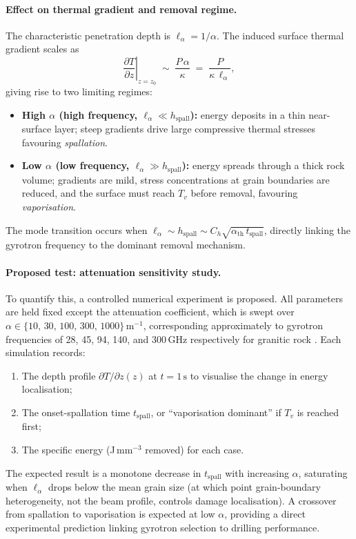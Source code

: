 \documentclass[12pt, a4paper]{article}
\begin{document}
\paragraph{Effect on thermal gradient and removal regime.}
The characteristic penetration depth is $\ell_\alpha = 1/\alpha$.
The induced surface thermal gradient scales as
\begin{equation}
    \left.\frac{\partial T}{\partial z}\right|_{z=z_0}
    \;\sim\; \frac{P\,\alpha}{\kappa}
    \;=\; \frac{P}{\kappa\,\ell_\alpha},
    \label{eq:grad_scale}
\end{equation}
giving rise to two limiting regimes:
\begin{itemize}[noitemsep]
    \item \textbf{High $\alpha$ (high frequency, $\ell_\alpha \ll
    h_\mathrm{spall}$):} energy deposits in a thin near-surface layer;
    steep gradients drive large compressive thermal stresses favouring
    \emph{spallation}.

    \item \textbf{Low $\alpha$ (low frequency, $\ell_\alpha \gg
    h_\mathrm{spall}$):} energy spreads through a thick rock volume;
    gradients are mild, stress concentrations at grain boundaries are
    reduced, and the surface must reach $T_v$ before removal, favouring
    \emph{vaporisation}.
\end{itemize}
The mode transition occurs when $\ell_\alpha \sim h_\mathrm{spall} \sim
C_h\sqrt{\alpha_\mathrm{th}\,t_\mathrm{spall}}$, directly linking the
gyrotron frequency to the dominant removal mechanism.

\paragraph{Proposed test: attenuation sensitivity study.}
\label{para:atten_test}
To quantify this, a controlled numerical experiment is proposed.  All
parameters are held fixed except the attenuation coefficient, which is
swept over
$\alpha \in \{10,\, 30,\, 100,\, 300,\, 1000\}\,\mathrm{m}^{-1}$,
corresponding approximately to gyrotron frequencies of 28, 45, 94, 140,
and 300\,GHz respectively for granitic rock \citep{woskov2009mmw}.
Each simulation records:
\begin{enumerate}[noitemsep]
    \item The depth profile $\partial T/\partial z(z)$ at $t = 1\,\mathrm{s}$
          to visualise the change in energy localisation;
    \item The onset-spallation time $t_\mathrm{spall}$, or ``vaporisation
          dominant'' if $T_v$ is reached first;
    \item The specific energy (J\,mm$^{-3}$ removed) for each case.
\end{enumerate}
The expected result is a monotone decrease in $t_\mathrm{spall}$ with
increasing $\alpha$, saturating when $\ell_\alpha$ drops below the mean
grain size (at which point grain-boundary heterogeneity, not the beam
profile, controls damage localisation).  A crossover from spallation to
vaporisation is expected at low $\alpha$, providing a direct experimental
prediction linking gyrotron selection to drilling performance.
\end{document}
